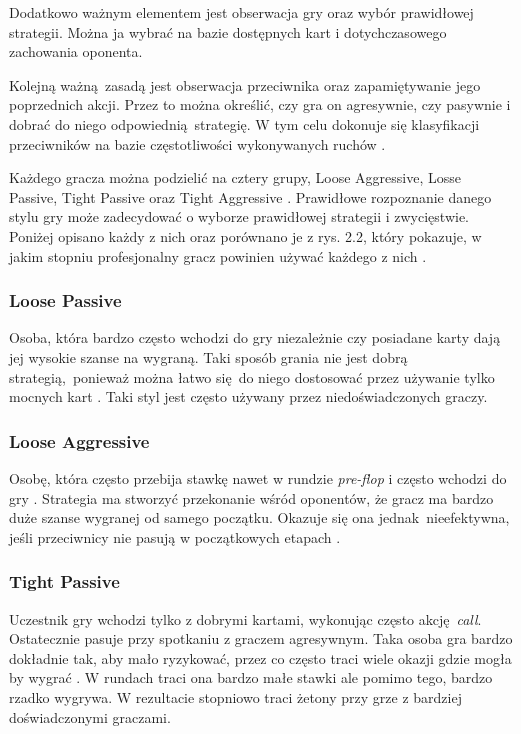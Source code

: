 \documentclass[12pt,oneside,a4paper]{report}
\begin{document}
\vspace{0.8cm}
Dodatkowo ważnym elementem jest obserwacja gry oraz wybór prawidłowej strategii.
Można ja wybrać na bazie dostępnych kart i dotychczasowego zachowania oponenta.

Kolejną ważną zasadą jest obserwacja przeciwnika oraz zapamiętywanie jego
poprzednich akcji. Przez to można określić, czy gra on agresywnie, czy pasywnie i dobrać do 
niego odpowiednią strategię. W tym celu dokonuje się klasyfikacji przeciwników na 
bazie częstotliwości wykonywanych ruchów \cite{class}.

Każdego gracza można podzielić na cztery grupy, Loose Aggressive, Losse Passive, Tight
Passive oraz Tight Aggressive \cite{class}. Prawidłowe rozpoznanie danego stylu gry
może zadecydować o wyborze prawidłowej strategii i zwycięstwie. Poniżej opisano każdy z nich oraz
porównano je z rys. 2.2, który pokazuje, w jakim stopniu profesjonalny gracz powinien używać każdego
z nich \cite{class}. 

\subsubsection{Loose Passive}

Osoba, która bardzo często wchodzi do gry niezależnie czy posiadane karty dają jej
wysokie szanse na wygraną. 
Taki sposób grania nie jest dobrą strategią, ponieważ można łatwo się do niego 
dostosować przez używanie tylko mocnych kart \cite{class}. 
Taki styl jest często używany 
przez niedoświadczonych graczy.

\subsubsection{Loose Aggressive}

Osobę, która często przebija stawkę nawet w rundzie \emph{pre-flop} i często wchodzi do gry
\cite{class}. Strategia ma stworzyć przekonanie wśród
oponentów, że gracz ma bardzo duże szanse wygranej od samego początku. 
Okazuje się ona jednak nieefektywna, jeśli przeciwnicy nie pasują w początkowych etapach 
\cite{class}. 

\subsubsection{Tight Passive}

Uczestnik gry wchodzi tylko z dobrymi kartami, wykonując często akcję \emph{call}. 
Ostatecznie pasuje przy spotkaniu z graczem agresywnym. Taka osoba gra bardzo dokładnie tak, aby
mało ryzykować, przez co często traci wiele okazji gdzie mogła by wygrać \cite{class}.
W rundach traci ona bardzo małe stawki ale pomimo tego, bardzo rzadko wygrywa. W rezultacie stopniowo traci
żetony przy grze z bardziej doświadczonymi graczami.
\end{document}
